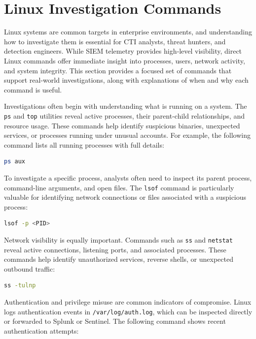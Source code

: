 \section{Linux Investigation Commands}

Linux systems are common targets in enterprise environments, and understanding how to investigate them is essential 
for CTI analysts, threat hunters, and detection engineers. While SIEM telemetry provides high‑level visibility, 
direct Linux commands offer immediate insight into processes, users, network activity, and system integrity. 
This section provides a focused set of commands that support real-world investigations, along with explanations 
of when and why each command is useful.

Investigations often begin with understanding what is running on a system. The \texttt{ps} and \texttt{top} utilities 
reveal active processes, their parent-child relationships, and resource usage. These commands help identify suspicious 
binaries, unexpected services, or processes running under unusual accounts. For example, the following command lists 
all running processes with full details:

\begin{lstlisting}[language=bash]
ps aux
\end{lstlisting}

To investigate a specific process, analysts often need to inspect its parent process, command-line arguments, and open files. 
The \texttt{lsof} command is particularly valuable for identifying network connections or files associated with a suspicious process:

\begin{lstlisting}[language=bash]
lsof -p <PID>
\end{lstlisting}

Network visibility is equally important. Commands such as \texttt{ss} and \texttt{netstat} reveal active connections, listening ports, 
and associated processes. These commands help identify unauthorized services, reverse shells, or unexpected outbound traffic:

\begin{lstlisting}[language=bash]
ss -tulnp
\end{lstlisting}

Authentication and privilege misuse are common indicators of compromise. Linux logs authentication events in \texttt{/var/log/auth.log}, 
which can be inspected directly or forwarded to Splunk or Sentinel. The following command shows recent authentication attempts:

